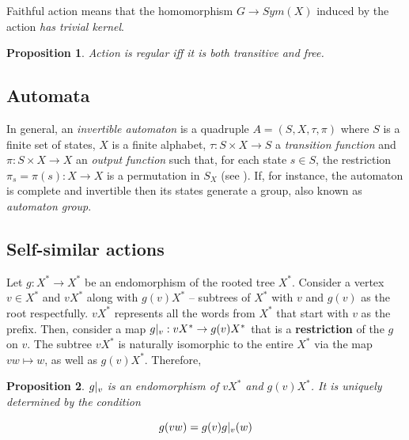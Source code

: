 \documentclass[a4paper,12pt]{amsart}
\newtheorem{proposition}{Proposition}
\begin{document}
	Faithful action means that the homomorphism $G \rightarrow Sym(X)$ induced by the action \textit{has trivial kernel}. 
	
	\begin{proposition}
		Action is regular iff it is both transitive and free. 
	\end{proposition}
	
	\subsection{Automata}
	In general, an \textit{invertible automaton} is a quadruple $A = (S, X, \tau, \pi)$ where $S$ is a finite set of states, $X$ is a finite alphabet, $\tau: S\times X \rightarrow S$ a \textit{transition function} and $\pi : S \times X \rightarrow X$ an \textit{output function} such that, for each state $s \in S$, the restriction $\pi_s = \pi(s) : X \rightarrow X$ is a permutation in $S_X$ (see \cite{Auto}).  If, for instance, the automaton is complete and invertible then its states generate a group, also known as \textit{automaton group}. 
	
	\subsection{Self-similar actions}
	Let $g : X^* \rightarrow X^* $ be an endomorphism of the rooted tree $X^*$. Consider a vertex $v \in X^*$ and $vX^*$ along with $g(v)X^*$ -- subtrees of $X^*$ with $v$ and $g(v)$ as the root respectfully. $vX^*$ represents all the words from $X^*$ that start with $v$ as the prefix. Then, consider a map $g\arrowvert_v: vX^* \rightarrow g(v)X^*$ that is a \textbf{restriction} of the $g$ on $v$. The subtree $vX^*$ is naturally isomorphic to the entire $X^*$ via the map $vw \mapsto w$, as well as $g(v)X^*$. Therefore,
	
	\begin{proposition}
		$g\arrowvert_v$ is an \textit{endomorphism} of $vX^*$ and $g(v)X^*$. It is uniquely determined by the condition 
	
		$$g(vw) = g(v)g\arrowvert_v(w)$$
	 
	\end{proposition}
	 
\end{document}
